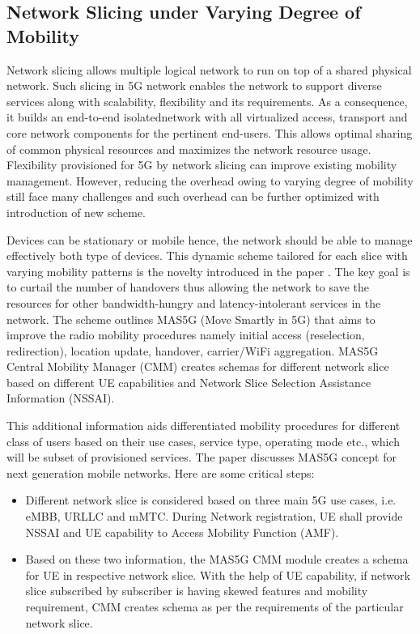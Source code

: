 \begin{multicols}{2}
\subsection{Network Slicing under Varying Degree of Mobility}

Network slicing allows multiple logical network to run on top of a shared physical network. Such slicing in 5G network enables the network to support diverse services along with scalability, flexibility and its requirements. As a consequence, it builds an end-to-end isolated\break network with all virtualized access, transport and core network components for the pertinent end-users. This allows optimal sharing of common physical resources and maximizes the network resource usage. Flexibility provisioned for 5G by network slicing can improve existing mobility management. However, reducing the overhead owing to varying degree of mobility still face many challenges and such overhead can be further optimized with introduction of new scheme.

Devices can be stationary or mobile hence, the network should be able to manage effectively both type of devices. This dynamic scheme tailored for each slice with varying mobility patterns is the novelty introduced in the paper \cite{art1-key01}. The key goal is to curtail the number of handovers thus allowing the network to save the resources for other bandwidth-hungry and latency-intolerant services in the network. The scheme outlines MAS5G (Move Smartly in 5G) that aims to improve the radio mobility procedures  namely initial access (reselection, redirection), location update, handover, carrier/WiFi aggregation. MAS5G Central Mobility Manager (CMM) creates schemas for different network slice based on different UE capabilities and Network Slice Selection Assistance Information (NSSAI). 

This additional information aids differentiated mobility procedures for different class of users based on their use cases, service type, operating mode etc., which will be subset of provisioned services. The paper discusses MAS5G concept for next generation mobile networks. Here are some critical steps:
\begin{itemize}
\itemsep=2pt
\item Different network slice is considered based on three main 5G use cases, i.e. eMBB, URLLC and mMTC. During Network registration, UE shall provide NSSAI and UE capability to Access Mobility Function  (AMF).

\item Based on these two information, the MAS5G CMM  module creates a schema for UE in respective network  slice. With the help of UE capability, if network slice subscribed by subscriber is having skewed features and mobility requirement, CMM creates schema as per the requirements of the particular network slice. 


\end{itemize}
\end{multicols}
